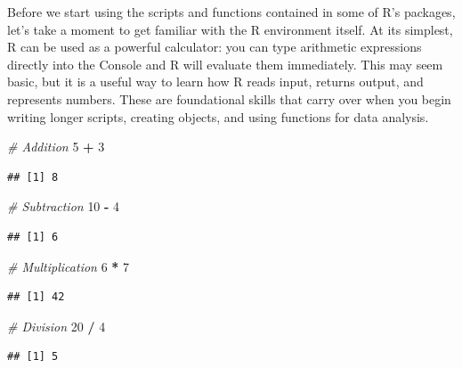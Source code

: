 \documentclass[
  11pt,
]{article}
\newenvironment{Shaded}{\begin{snugshade}}{\end{snugshade}}
\newcommand{\CommentTok}[1]{\textcolor[rgb]{0.56,0.35,0.01}{\textit{#1}}}
\newcommand{\DecValTok}[1]{\textcolor[rgb]{0.00,0.00,0.81}{#1}}
\newcommand{\SpecialCharTok}[1]{\textcolor[rgb]{0.81,0.36,0.00}{\textbf{#1}}}
\begin{document}
Before we start using the scripts and functions contained in some of R's
packages, let's take a moment to get familiar with the R environment
itself. At its simplest, R can be used as a powerful calculator: you can
type arithmetic expressions directly into the Console and R will
evaluate them immediately. This may seem basic, but it is a useful way
to learn how R reads input, returns output, and represents numbers.
These are foundational skills that carry over when you begin writing
longer scripts, creating objects, and using functions for data analysis.

\begin{Shaded}
\begin{Highlighting}[]
\CommentTok{\# Addition}
\DecValTok{5} \SpecialCharTok{+} \DecValTok{3}
\end{Highlighting}
\end{Shaded}

\begin{verbatim}
## [1] 8
\end{verbatim}

\begin{Shaded}
\begin{Highlighting}[]
\CommentTok{\# Subtraction}
\DecValTok{10} \SpecialCharTok{{-}} \DecValTok{4}
\end{Highlighting}
\end{Shaded}

\begin{verbatim}
## [1] 6
\end{verbatim}

\begin{Shaded}
\begin{Highlighting}[]
\CommentTok{\# Multiplication}
\DecValTok{6} \SpecialCharTok{*} \DecValTok{7}
\end{Highlighting}
\end{Shaded}

\begin{verbatim}
## [1] 42
\end{verbatim}

\begin{Shaded}
\begin{Highlighting}[]
\CommentTok{\# Division}
\DecValTok{20} \SpecialCharTok{/} \DecValTok{4}
\end{Highlighting}
\end{Shaded}

\begin{verbatim}
## [1] 5
\end{verbatim}
\end{document}
